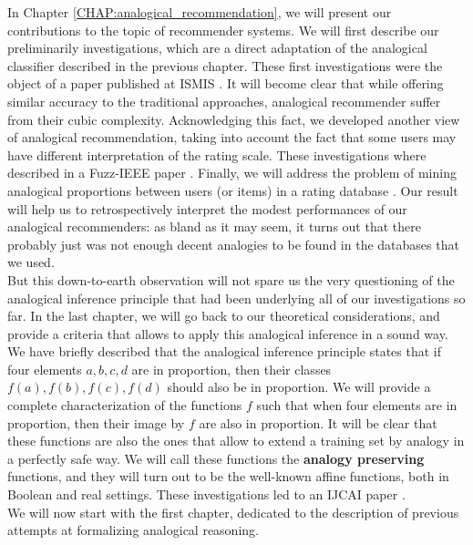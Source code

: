 In Chapter \ref{CHAP:analogical_recommendation}, we will present our
contributions to the topic of recommender systems. We will first describe our
preliminarily investigations, which are a direct adaptation of the analogical
classifier described in the previous chapter. These first investigations were
the object of a paper published at ISMIS \cite{HugPraRicISMIS15}. It will
become clear that while offering similar accuracy to the traditional
approaches, analogical recommender suffer from their cubic complexity.
Acknowledging this fact, we developed another view of analogical
recommendation, taking into account the fact that some users may have different
interpretation of the rating scale. These investigations where described in a
Fuzz-IEEE paper \cite{HugPraRicSerFuzzIEEE16}. Finally, we will address the
problem of mining analogical proportions between users (or items) in a rating
database \cite{HugPraRicSerLFA16}. Our result will help us to retrospectively
interpret the modest performances of our analogical recommenders: as bland as
it may seem, it turns out that there probably just was not enough decent
analogies to be found in the databases that we used.\\

But this down-to-earth observation will not spare us the very questioning of
the analogical inference principle that had been underlying all of our
investigations so far. In the last chapter, we will go back to our theoretical
considerations, and provide a criteria that allows to apply this analogical
inference in a sound way. We have briefly described that the analogical
inference principle states that if four elements $a, b, c, d$ are in proportion,
then their classes $f(a), f(b), f(c), f(d)$ should also be in proportion. We
will provide a complete characterization of the functions $f$ such that when
four elements are in proportion, then their image by $f$ are also in
proportion. It will be clear that these functions are also the ones that allow
to extend a training set by analogy in a perfectly safe way. We will call these
functions the \textbf{analogy preserving} functions, and they will turn out to
be the well-known affine functions, both in Boolean and real settings. These
investigations led to an IJCAI paper \cite{CouHugPraRicIJCAI17}.\\


We will now start with the first chapter, dedicated to the description of
previous attempts at formalizing analogical reasoning.
